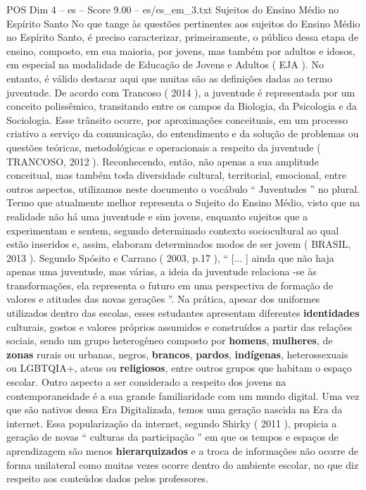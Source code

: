 \begin{textsample}{POS Dim 4 – es – Score 9.00 – es/es\_em\_3.txt}  \label{ex:f4_pos_078}
Sujeitos do Ensino Médio no Espírito Santo No que tange às questões pertinentes aos sujeitos do Ensino Médio no Espírito Santo, é preciso caracterizar, primeiramente, o público dessa etapa de ensino, composto, em sua maioria, por jovens, mas também por adultos e idosos, em especial na modalidade de Educação de Jovens e Adultos ( EJA ).
No entanto, é válido destacar aqui que muitas são as definições dadas ao termo juventude.
De acordo com Trancoso ( 2014 ), a juventude é representada por um conceito polissêmico, transitando entre os campos da Biologia, da Psicologia e da Sociologia.
Esse trânsito ocorre, por aproximações conceituais, em um processo criativo a serviço da comunicação, do entendimento e da solução de problemas ou questões teóricas, metodológicas e operacionais a respeito da juventude ( TRANCOSO, 2012 ).
Reconhecendo, então, não apenas a sua amplitude conceitual, mas também toda diversidade cultural, territorial, emocional, entre outros aspectos, utilizamos neste documento o vocábulo “ Juventudes ” no plural.
Termo que atualmente melhor representa o Sujeito do Ensino Médio, visto que na realidade não há uma juventude e sim jovens, enquanto sujeitos que a experimentam e sentem, segundo determinado contexto sociocultural ao qual estão inseridos e, assim, elaboram determinados modos de ser jovem ( BRASIL, 2013 ).
Segundo Spósito e Carrano ( 2003, p.17 ), “ [... ] ainda que não haja apenas uma juventude, mas várias, a ideia da juventude relaciona -se às transformações, ela representa o futuro em uma perspectiva de formação de valores e atitudes das novas gerações ”.
Na prática, apesar dos uniformes utilizados dentro das escolas, esses estudantes apresentam diferentes \textbf{identidades} culturais, gostos e valores próprios assumidos e construídos a partir das relações sociais, sendo um grupo heterogêneo composto por \textbf{homens}, \textbf{mulheres}, de \textbf{zonas} rurais ou urbanas, negros, \textbf{brancos}, \textbf{pardos}, \textbf{indígenas}, heterossexuais ou LGBTQIA+, ateus ou \textbf{religiosos}, entre outros grupos que habitam o espaço escolar.
Outro aspecto a ser considerado a respeito dos jovens na contemporaneidade é a sua grande familiaridade com um mundo digital.
Uma vez que são nativos dessa Era Digitalizada, temos uma geração nascida na Era da internet.
Essa popularização da internet, segundo Shirky ( 2011 ), propicia a geração de novas “ culturas da participação ” em que os tempos e espaços de aprendizagem são menos \textbf{hierarquizados} e a troca de informações não ocorre de forma unilateral como muitas vezes ocorre dentro do ambiente escolar, no que diz respeito aos conteúdos dados pelos professores.

\end{textsample}
